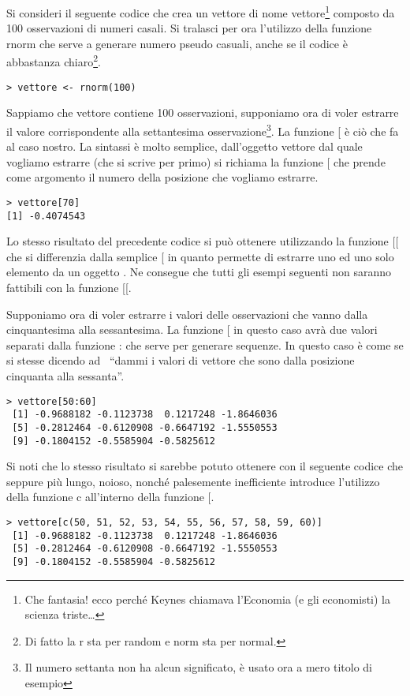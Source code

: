 Si consideri il seguente codice che crea un vettore di nome \textsf{vettore}\footnote{Che fantasia! ecco perché Keynes chiamava l'Economia (e gli economisti) la scienza triste\dots} composto da 100 osservazioni di numeri casali. Si tralasci per ora l'utilizzo della funzione \textsf{rnorm} che serve a generare numero pseudo casuali, anche se il codice è abbastanza chiaro\footnote{Di fatto la \textsf{r} sta per random e \textsf{norm} sta per normal.}.
\begin{lstlisting}
> vettore <- rnorm(100)
\end{lstlisting}

Sappiamo che \textsf{vettore} contiene 100 osservazioni, supponiamo ora di voler estrarre il valore corrispondente alla settantesima osservazione\footnote{Il numero settanta non ha alcun significato, è usato ora a mero titolo di esempio}. La funzione [ è ciò che fa al caso nostro. La sintassi è molto semplice, dall'oggetto vettore dal quale vogliamo estrarre (che si scrive per primo) si richiama la funzione [ che prende come argomento il numero della posizione che vogliamo estrarre.
\begin{lstlisting}
> vettore[70]
[1] -0.4074543
\end{lstlisting}

Lo stesso risultato del precedente codice si può ottenere utilizzando la funzione \textsf{[[} che si differenzia dalla semplice \textsf{[} in quanto permette di estrarre uno ed uno solo elemento da un oggetto \erre. Ne consegue che tutti gli esempi seguenti non saranno fattibili con la funzione \textsf{[[}.

Supponiamo ora di voler estrarre i valori delle osservazioni che vanno dalla cinquantesima alla sessantesima. La funzione [ in questo caso avrà due valori separati dalla funzione \textsf{:} che serve per generare sequenze. In questo caso è come se si stesse dicendo ad \erre\ ``dammi i valori di vettore che sono dalla posizione cinquanta alla sessanta''.
\begin{lstlisting}
> vettore[50:60]
 [1] -0.9688182 -0.1123738  0.1217248 -1.8646036
 [5] -0.2812464 -0.6120908 -0.6647192 -1.5550553
 [9] -0.1804152 -0.5585904 -0.5825612
\end{lstlisting}

Si noti che lo stesso risultato si sarebbe potuto ottenere con il seguente codice che seppure più lungo, noioso, nonché palesemente inefficiente introduce l'utilizzo della funzione \textsf{c} all'interno della funzione \textsf{[}.
\begin{lstlisting}
> vettore[c(50, 51, 52, 53, 54, 55, 56, 57, 58, 59, 60)]
 [1] -0.9688182 -0.1123738  0.1217248 -1.8646036
 [5] -0.2812464 -0.6120908 -0.6647192 -1.5550553
 [9] -0.1804152 -0.5585904 -0.5825612
\end{lstlisting}

